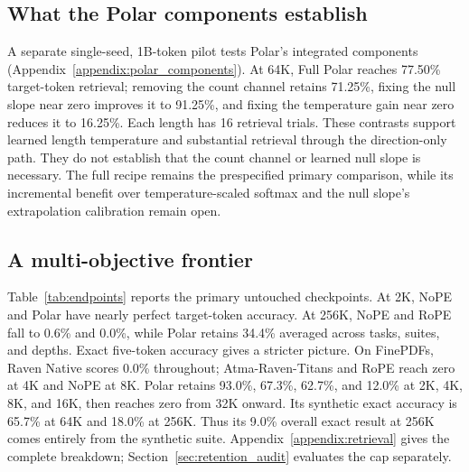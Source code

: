 \documentclass{article}
\begin{document}
\subsection{What the Polar components establish}
A separate single-seed, 1B-token pilot tests Polar's integrated components (Appendix~\ref{appendix:polar_components}). At 64K, Full Polar reaches 77.50\% target-token retrieval; removing the count channel retains 71.25\%, fixing the null slope near zero improves it to 91.25\%, and fixing the temperature gain near zero reduces it to 16.25\%. Each length has 16 retrieval trials. These contrasts support learned length temperature and substantial retrieval through the direction-only path. They do not establish that the count channel or learned null slope is necessary. The full recipe remains the prespecified primary comparison, while its incremental benefit over temperature-scaled softmax and the null slope's extrapolation calibration remain open.

\subsection{A multi-objective frontier}

Table~\ref{tab:endpoints} reports the primary untouched checkpoints. At 2K, NoPE and Polar have nearly perfect target-token accuracy. At 256K, NoPE and RoPE fall to 0.6\% and 0.0\%, while Polar retains 34.4\% averaged across tasks, suites, and depths. Exact five-token accuracy gives a stricter picture. On FinePDFs, Raven Native scores 0.0\% throughout; Atma-Raven-Titans and RoPE reach zero at 4K and NoPE at 8K. Polar retains 93.0\%, 67.3\%, 62.7\%, and 12.0\% at 2K, 4K, 8K, and 16K, then reaches zero from 32K onward. Its synthetic exact accuracy is 65.7\% at 64K and 18.0\% at 256K. Thus its 9.0\% overall exact result at 256K comes entirely from the synthetic suite. Appendix~\ref{appendix:retrieval} gives the complete breakdown; Section~\ref{sec:retention_audit} evaluates the cap separately.
\end{document}
